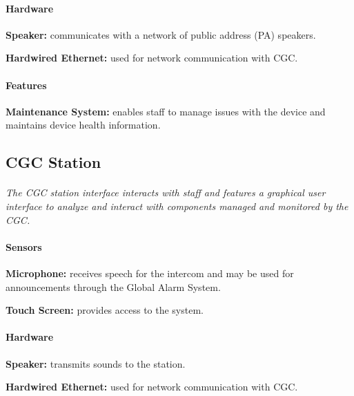 \documentclass[12pt]{article}
\begin{document}
    \paragraph{Hardware}
    \begin{list}{}{}
        \item \textbf{Speaker:} communicates with a network of public address (PA) speakers.
        \item \textbf{Hardwired Ethernet:} used for network communication with CGC. 
    \end{list}
    
    \paragraph{Features}
    \begin{list}{}{}
        \item \textbf{Maintenance System:} enables staff to manage issues with the device    and 
        maintains device health information.
    \end{list}


    \subsection{CGC Station}
    \paragraph{} \textit{The CGC station interface interacts with staff and features a 
    graphical user interface to analyze and interact with components managed and monitored
    by the CGC.}        
    
    \paragraph{Sensors}
    \begin{list}{}{}
        \item \textbf{Microphone:} receives speech for the intercom and may be used 
        for announcements through the Global Alarm System.
        \item \textbf{Touch Screen:} provides access to the system.
    \end{list}
        
    \paragraph{Hardware}
    \begin{list}{}{}
        \item \textbf{Speaker:} transmits sounds to the station.
        \item \textbf{Hardwired Ethernet:} used for network communication with CGC. 
    \end{list}
    
\end{document}
